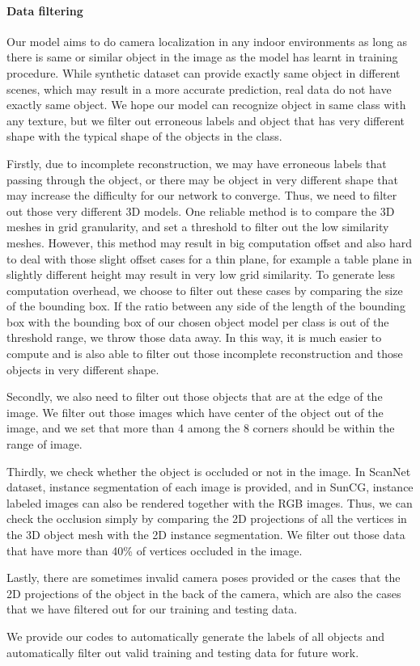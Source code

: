 \paragraph{Data filtering}
\label{sec:data_filtering}
Our model aims to do camera localization in any indoor environments as long as there is same or similar object in the image as the model has learnt in training procedure. While synthetic dataset can provide exactly same object in different scenes, which may result in a more accurate prediction, real data do not have exactly same object. We hope our model can recognize object in same class with any texture, but we filter out erroneous labels and object that has very different shape with the typical shape of the objects in the class.

Firstly, due to incomplete reconstruction, we may have erroneous labels that passing through the object, or there may be object in very different shape that may increase the difficulty for our network to converge. Thus, we need to filter out those very different 3D models. One reliable method is to compare the 3D meshes in grid granularity, and set a threshold to filter out the low similarity meshes. However, this method may result in big computation offset and also hard to deal with those slight offset cases for a thin plane, for example a table plane in slightly different height may result in very low grid similarity. To generate less computation overhead, we choose to filter out these cases by comparing the size of the bounding box. If the ratio between any side of the length of the bounding box with the bounding box of our chosen object model per class is out of the threshold range, we throw those data away. In this way, it is much easier to compute and is also able to filter out those incomplete reconstruction and those objects in very different shape.

Secondly, we also need to filter out those objects that are at the edge of the image. We filter out those images which have center of the object out of the image, and we set that more than 4 among the 8 corners should be within the range of image.

Thirdly, we check whether the object is occluded or not in the image. In ScanNet dataset, instance segmentation of each image is provided, and in SunCG, instance labeled images can also be rendered together with the RGB images. Thus, we can check the occlusion simply by comparing the 2D projections of all the vertices in the 3D object mesh with the 2D instance segmentation. We filter out those data that have more than 40\% of vertices occluded in the image.

Lastly, there are sometimes invalid camera poses provided or the cases that the 2D projections of the object in the back of the camera, which are also the cases that we have filtered out for our training and testing data.

We provide our codes to automatically generate the labels of all objects and automatically filter out valid training and testing data for future work.


